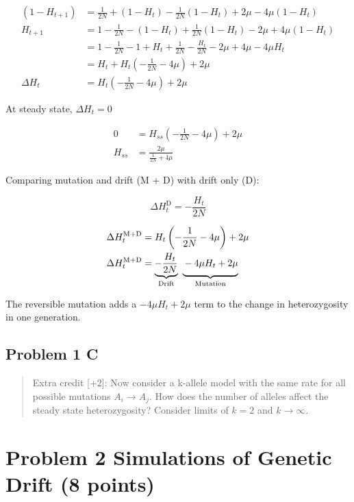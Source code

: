 \documentclass[
  letterpaper,
  DIV=11,
  numbers=noendperiod]{scrartcl}
\begin{document}
\[
\begin{aligned}
(1-H_{t+1})&=\frac{1}{2N}+(1-H_{t})-\frac{1}{2N}(1-H_{t})+2\mu-4\mu (1-H_{t})\\
H_{t+1}&=1-\frac{1}{2N}-(1-H_{t})+\frac{1}{2N}(1-H_{t})-2\mu+4\mu (1-H_{t})\\
&=1-\frac{1}{2N}-1+H_t+\frac{1}{2N}-\frac{H_t}{2N}-2\mu + 4\mu-4\mu H_t\\
&=H_t+ H_t\left(-\frac{1}{2N}-4\mu\right)+2\mu\\
\Delta H_t &=  H_t\left(-\frac{1}{2N}-4\mu\right)+2\mu
\end{aligned}
\]

At steady state, \(\Delta H_t = 0\)

\[
\begin{aligned}
0&=  H_{ss}\left(-\frac{1}{2N}-4\mu\right)+2\mu\\
H_{ss}&=\frac{2\mu}{\frac{1}{2N}+4\mu}
\end{aligned}
\]

Comparing mutation and drift (M + D) with drift only (D):

\[\Delta H_t^\mathrm{D} =  -\frac{H_t}{2N}\]

\[
\begin{aligned}
\Delta H_t^\mathrm{M+D} &=  H_t\left(-\frac{1}{2N}-4\mu\right)+2\mu\\
\Delta H_t^\mathrm{M+D}&= \underbrace{-\frac{H_t}{2N}}_{\text{Drift}}\ \underbrace{\vphantom{-\frac{H_t}{2N}}-4\mu H_t+2\mu}_{\text{Mutation}}\\
\end{aligned}
\]

The reversible mutation adds a \(-4\mu H_t+2\mu\) term to the change in
heterozygosity in one generation.

\hypertarget{problem-1-c}{%
\subsection{Problem 1 C}\label{problem-1-c}}

\begin{quote}
Extra credit {[}+2{]}: Now consider a k-allele model with the same rate
for all possible mutations \(A_i \to A_j\). How does the number of
alleles affect the steady state heterozygosity? Consider limits of
\(k=2\) and \(k \to \infty\).
\end{quote}

\hypertarget{problem-2-simulations-of-genetic-drift-8-points}{%
\section{Problem 2 Simulations of Genetic Drift (8
points)}\label{problem-2-simulations-of-genetic-drift-8-points}}
\end{document}
